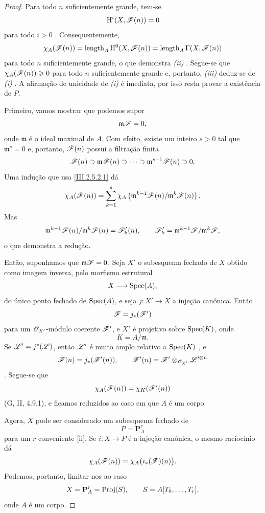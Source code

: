 \begin{proof}
Para todo $n$ suficientemente grande, tem-se
\[
  \mathrm{H}^i(X,\mathscr{F}(n))=0
\]
para todo $i>0$ .
Consequentemente,
\[
  \chi_A(\mathscr{F}(n))
  =
  \operatorname{length}_A\mathrm{H}^0(X,\mathscr{F}(n))
  =
  \operatorname{length}_A\Gamma(X,\mathscr{F}(n))
\]
para todo $n$ suficientemente grande, o que demonstra \emph{(ii) }.
Segue-se que $\chi_A(\mathscr{F}(n))\geqslant0$ para todo $n$ suficientemente grande e, portanto, \emph{(iii) } deduz-se de \emph{(i) }.
A afirmação de unicidade de \emph{(i) } é imediata, por isso resta provar a existência de $P$.

Primeiro, vamos mostrar que podemos supor
\[
  \mathfrak{m}\mathscr{F}=0,
\]
onde $\mathfrak{m}$ é o ideal maximal de $A$.
Com efeito, existe um inteiro $s>0$ tal que $\mathfrak{m}^s=0$ e, portanto, $\mathscr{F}(n)$ possui a filtração finita
\[
  \mathscr{F}(n)
  \supset\mathfrak{m}\mathscr{F}(n)
  \supset\cdots
  \supset\mathfrak{m}^{s-1}\mathscr{F}(n)
  \supset0.
\]
Uma indução que usa \eqref{III.2.5.2.1} dá
\[
  \chi_A(\mathscr{F}(n))
  =
  \sum_{k=1}^{s}
  \chi_A\left(
    \mathfrak{m}^{k-1}\mathscr{F}(n)/
    \mathfrak{m}^{k}\mathscr{F}(n)
  \right).
\]
Mas
\[
  \mathfrak{m}^{k-1}\mathscr{F}(n)/
  \mathfrak{m}^{k}\mathscr{F}(n)
  =
  \mathscr{F}'_k(n),
  \qquad
  \mathscr{F}'_k=
  \mathfrak{m}^{k-1}\mathscr{F}/\mathfrak{m}^{k}\mathscr{F},
\]
o que demonstra a redução.

Então, suponhamos que $\mathfrak{m}\mathscr{F}=0$.
Seja $X'$ o subesquema fechado de $X$ obtido como imagem inversa, pelo morfismo estrutural
\[
  X\longrightarrow\operatorname{Spec}(A),
\]
do único ponto fechado de $\operatorname{Spec}(A)$, e seja $j:X'\to X$ a injeção canônica.
Então
\[
  \mathscr{F}=j_*(\mathscr{F}')
\]
para um $\mathscr{O}_{X'}$-módulo coerente $\mathscr{F}'$, e $X'$ é projetivo sobre $\operatorname{Spec}(K)$, onde
\[
  K=A/\mathfrak{m}.
\]
Se $\mathscr{L}'=j^*(\mathscr{L})$, então $\mathscr{L}'$ é muito amplo relativo a $\operatorname{Spec}(K)$ , e
\[
  \mathscr{F}(n)=j_*(\mathscr{F}'(n)),
  \qquad
  \mathscr{F}'(n)
  =
  \mathscr{F}'\otimes_{\mathscr{O}_{X'}}\mathscr{L}'^{\otimes n}
\]
.
Segue-se que
\[
  \chi_A(\mathscr{F}(n))
  =
  \chi_K(\mathscr{F}'(n))
\]
(G, II, 4.9.1), e ficamos reduzidos ao caso em que $A$ é um corpo.

Agora, $X$ pode ser considerado um subesquema fechado de
\[
  P=\mathbf{P}_A^r
\]
para um $r$ conveniente [ii].
Se $i:X\to P$ é a injeção canônica, o mesmo raciocínio dá
\[
  \chi_A(\mathscr{F}(n))
  =
  \chi_A\bigl(i_*(\mathscr{F})(n)\bigr).
\]
Podemos, portanto, limitar-nos ao caso
\[
  X=\mathbf{P}_A^r=\operatorname{Proj}(S),
  \qquad
  S=A[T_0,\ldots,T_r],
\]
onde $A$ é um corpo.


\end{proof}
